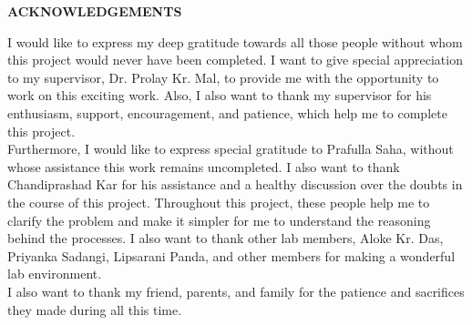 \begin{center}
{\bf ACKNOWLEDGEMENTS}
\end{center}

I would like to express my deep gratitude towards all those people without whom this project would never have been completed. I want to give special appreciation to my supervisor, Dr. Prolay Kr. Mal, to provide me with the opportunity to work on this exciting work. Also, I also want to thank my supervisor for his enthusiasm, support, encouragement, and patience, which help me to complete this project.\\

Furthermore, I would like to express special gratitude to Prafulla Saha, without whose assistance this work remains uncompleted.  I also want to thank Chandiprashad Kar for his assistance and a healthy discussion over the doubts in the course of this project. Throughout this project, these people help me to clarify the problem and make it simpler for me to understand the reasoning behind the processes. I also want to thank other lab members, Aloke Kr. Das, Priyanka Sadangi, Lipsarani Panda, and other members for making a wonderful lab environment.\\

I also want to thank my friend, parents, and family for the patience and sacrifices they made during all this time.

